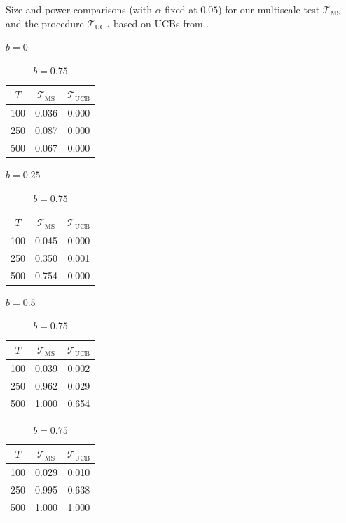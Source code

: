 \documentclass[12pt]{article}
\begin{document}
\begin{table}[t!]
\renewcommand{\arraystretch}{1.2}  
\footnotesize{
\begin{center}
\caption{Size and power comparisons (with $\alpha$ fixed at $0.05$) for our multiscale test $\mathcal{T}_{\text{MS}}$ and the procedure $\mathcal{T}_{\text{UCB}}$ based on UCBs from \cite{Kim2016}.}\label{tab:sizepower_UCB}
\vspace{-0.25cm}


\begin{subtable}[b]{0.23\textwidth}
\centering  
\caption{$b=0$}
\begin{tabular}{ccc}
  \hline
 $T$ & $\mathcal{T}_{\text{MS}}$ & $\mathcal{T}_{\text{UCB}}$ \\
 \hline
100 & 0.036 & 0.000 \\ 
  250 & 0.087 & 0.000 \\ 
  500 & 0.067 & 0.000 \\ 
   \hline
\end{tabular}
\end{subtable}
\begin{subtable}[b]{0.23\textwidth}
\centering  
\caption{$b=0.25$}
\begin{tabular}{ccc}
  \hline
 $T$ & $\mathcal{T}_{\text{MS}}$ & $\mathcal{T}_{\text{UCB}}$ \\
 \hline
100 & 0.045 & 0.000 \\ 
  250 & 0.350 & 0.001 \\ 
  500 & 0.754 & 0.000 \\ 
   \hline
\end{tabular}
\end{subtable}
\begin{subtable}[b]{0.23\textwidth}
\centering  
\vspace{0.25cm} \caption{$b=0.5$}
\begin{tabular}{ccc}
  \hline
 $T$ & $\mathcal{T}_{\text{MS}}$ & $\mathcal{T}_{\text{UCB}}$ \\
 \hline
100 & 0.039 & 0.002 \\ 
  250 & 0.962 & 0.029 \\ 
  500 & 1.000 & 0.654 \\ 
   \hline
\end{tabular}
\end{subtable}
\begin{subtable}[b]{0.23\textwidth}
\centering  
\vspace{0.25cm} \caption{$b=0.75$}
\begin{tabular}{ccc}
  \hline
 $T$ & $\mathcal{T}_{\text{MS}}$ & $\mathcal{T}_{\text{UCB}}$ \\
 \hline
100 & 0.029 & 0.010 \\ 
  250 & 0.995 & 0.638 \\ 
  500 & 1.000 & 1.000 \\ 
   \hline
\end{tabular}
\end{subtable}
\end{center}}
\end{table}
\end{document}

